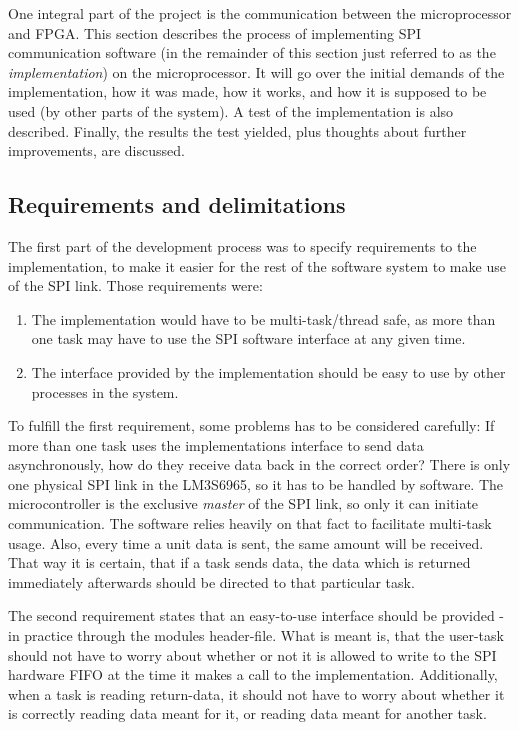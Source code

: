One integral part of the project is the communication between the microprocessor and FPGA. This section describes the process of implementing SPI communication software (in the remainder of this section just referred to as the \textit{implementation}) on the microprocessor. It will go over the initial demands of the implementation, how it was made, how it works, and how it is supposed to be used (by other parts of the system). A test of the implementation is also described. Finally, the results the test yielded, plus thoughts about further improvements, are discussed.

\subsection{Requirements and delimitations}\label{sec:spi_software_reqs}
The first part of the development process was to specify requirements to the implementation, to make it easier for the rest of the software system to make use of the SPI link. Those requirements were:
\begin{enumerate}
  \item The implementation would have to be multi-task/thread safe, as more than one task may have to use the SPI software interface at any given time.
  \item The interface provided by the implementation should be easy to use by other processes in the system.
\end{enumerate}

To fulfill the first requirement, some problems has to be considered carefully: If more than one task uses the implementations interface to send data asynchronously, how do they receive data back in the correct order? There is only one physical SPI link in the LM3S6965, so it has to be handled by software.
The microcontroller is the exclusive \textit{master} of the SPI link, so only it can initiate communication. The software relies heavily on that fact to facilitate multi-task usage. Also, every time a unit data is sent, the same amount will be received. That way it is certain, that if a task sends data, the data which is returned immediately afterwards should be directed to that particular task.

The second requirement states that an easy-to-use interface should be provided - in practice through the modules header-file. What is meant is, that the user-task should not have to worry about whether or not it is allowed to write to the SPI hardware FIFO at the time it makes a call to the implementation. Additionally, when a task is reading return-data, it should not have to worry about whether it is correctly reading data meant for it, or reading data meant for another task.

